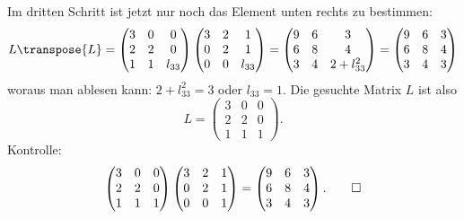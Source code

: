 \begin{loesung}
Im dritten Schritt ist jetzt nur noch das Element unten rechts zu bestimmen:
\[
L\transpose{L}=
\begin{pmatrix}
3&0&     0\\
2&2&     0\\
1&1&l_{33}
\end{pmatrix}
\begin{pmatrix}
3&2&     1\\
0&2&     1\\
0&0&l_{33}
\end{pmatrix}
=
\begin{pmatrix}
9&6&3\\
6&8&4\\
3&4&2+l_{33}^2
\end{pmatrix}
=
\begin{pmatrix}
9&6&3\\
6&8&4\\
3&4&3
\end{pmatrix}
\]
woraus man ablesen kann: $2+l_{33}^2=3$ oder $l_{33}=1$. Die gesuchte
Matrix $L$ ist also
\[
L=
\begin{pmatrix}
3&0&0\\
2&2&0\\
1&1&1
\end{pmatrix}.
\]
Kontrolle:
\[
\begin{pmatrix}
3&0&0\\
2&2&0\\
1&1&1
\end{pmatrix}
\begin{pmatrix}
3&2&1\\
0&2&1\\
0&0&1
\end{pmatrix}
=
\begin{pmatrix}
9&6&3\\
6&8&4\\
3&4&3
\end{pmatrix}.
\qedhere
\]
\end{loesung}
